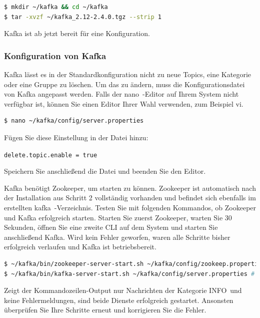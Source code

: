 \documentclass[a4paper,titlepage,halfparskip,12pt]{scrreprt}
\begin{document}
\begin{onehalfspacing}
\smallskip

\begin{lstlisting}[language=Bash]
$ mkdir ~/kafka && cd ~/kafka
$ tar -xvzf ~/kafka_2.12-2.4.0.tgz --strip 1
\end{lstlisting}

Kafka ist ab jetzt bereit für eine Konfiguration.

\subsubsection*{Konfiguration von Kafka}

Kafka lässt es in der Standardkonfiguration nicht zu neue Topics, eine Kategorie oder eine Gruppe zu löschen. Um das zu ändern, muss die Konfigurationsdatei von Kafka angepasst werden. Falls der \glqq nano\grqq\ -Editor auf Ihrem System nicht verfügbar ist, können Sie einen Editor Ihrer Wahl verwenden, zum Beispiel \glqq vi\grqq.

\smallskip

\begin{lstlisting}[language=Bash]
$ nano ~/kafka/config/server.properties
\end{lstlisting}

Fügen Sie diese Einstellung in der Datei hinzu:

\texttt{delete.topic.enable = true}

Speichern Sie anschließend die Datei und beenden Sie den Editor.

Kafka benötigt Zookeeper, um starten zu können. Zookeeper ist automatisch nach der Installation aus Schritt 2 vollständig vorhanden und befindet sich ebenfalls im erstellten \glqq kafka\grqq\ -Verzeichnis. Testen Sie mit folgenden Kommandos, ob Zookeeper und Kafka erfolgreich starten. Starten Sie zuerst Zookeeper, warten Sie 30 Sekunden, öffnen Sie eine zweite CLI auf dem System und starten Sie anschließend Kafka. Wird kein Fehler geworfen, waren alle Schritte bisher erfolgreich verlaufen und Kafka ist betriebsbereit.

\smallskip

\begin{lstlisting}[language=Bash]
$ ~/kafka/bin/zookeeper-server-start.sh ~/kafka/config/zookeep.properties # Start: zookeeper
$ ~/kafka/bin/kafka-server-start.sh ~/kafka/config/server.properties # Start: kafka
\end{lstlisting}

Zeigt der Kommandozeilen-Output nur Nachrichten der Kategorie \glqq INFO\grqq\ und keine Fehlermeldungen, sind beide Dienste erfolgreich gestartet. Ansonsten überprüfen Sie Ihre Schritte erneut und korrigieren Sie die Fehler.


\end{onehalfspacing}
\end{document}
